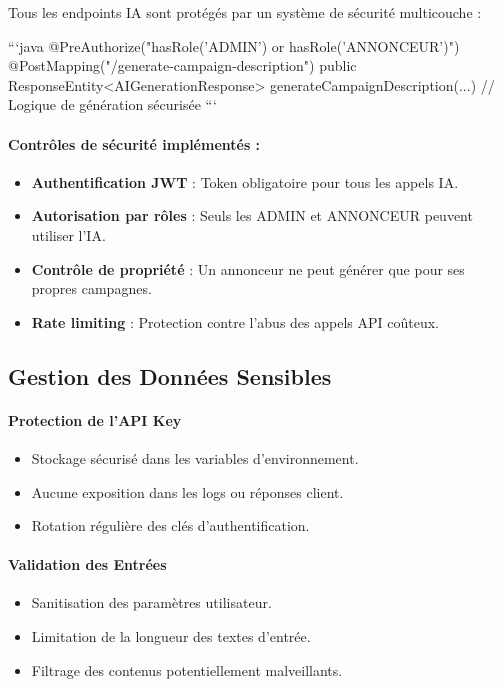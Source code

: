 Tous les endpoints IA sont protégés par un système de sécurité multicouche :

```java
@PreAuthorize("hasRole('ADMIN') or hasRole('ANNONCEUR')")
@PostMapping("/generate-campaign-description")
public ResponseEntity<AIGenerationResponse> generateCampaignDescription(...) {
    // Logique de génération sécurisée
}
```

\paragraph{Contrôles de sécurité implémentés :}
\begin{itemize}[label=\textbullet]
    \item \textbf{Authentification JWT} : Token obligatoire pour tous les appels IA.
    \item \textbf{Autorisation par rôles} : Seuls les ADMIN et ANNONCEUR peuvent utiliser l'IA.
    \item \textbf{Contrôle de propriété} : Un annonceur ne peut générer que pour ses propres campagnes.
    \item \textbf{Rate limiting} : Protection contre l'abus des appels API coûteux.
\end{itemize}

\subsection{Gestion des Données Sensibles}

\paragraph{Protection de l'API Key}
\begin{itemize}[label=\textbullet]
    \item Stockage sécurisé dans les variables d'environnement.
    \item Aucune exposition dans les logs ou réponses client.
    \item Rotation régulière des clés d'authentification.
\end{itemize}

\paragraph{Validation des Entrées}
\begin{itemize}[label=\textbullet]
    \item Sanitisation des paramètres utilisateur.
    \item Limitation de la longueur des textes d'entrée.
    \item Filtrage des contenus potentiellement malveillants.
\end{itemize}

